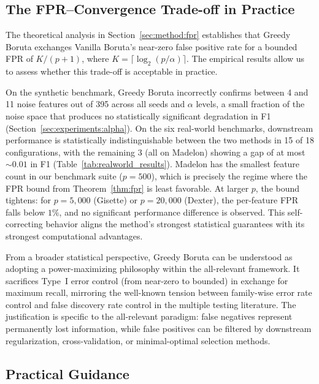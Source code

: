 \documentclass[runningheads]{llncs}
\begin{document}
\subsection{The FPR--Convergence Trade-off in Practice}
\label{sec:discussion:tradeoff}

The theoretical analysis in Section~\ref{sec:method:fpr} establishes that Greedy Boruta exchanges Vanilla Boruta's near-zero false positive rate for a bounded FPR of $K/(p+1)$, where $K = \lceil \log_2(p/\alpha) \rceil$. The empirical results allow us to assess whether this trade-off is acceptable in practice. 

On the synthetic benchmark, Greedy Boruta incorrectly confirms between 4 and 11 noise features out of 395 across all seeds and $\alpha$ levels, a small fraction of the noise space that produces no statistically significant degradation in F1 (Section~\ref{sec:experiments:alpha}). On the six real-world benchmarks, downstream performance is statistically indistinguishable between the two methods in 15 of 18 configurations, with the remaining 3 (all on Madelon) showing a gap of at most ${\sim}0.01$ in F1 (Table~\ref{tab:realworld_results}). Madelon has the smallest feature count in our benchmark suite ($p = 500$), which is precisely the regime where the FPR bound from Theorem~\ref{thm:fpr} is least favorable. At larger $p$, the bound tightens: for $p = 5{,}000$ (Gisette) or $p = 20{,}000$ (Dexter), the per-feature FPR falls below $1\%$, and no significant performance difference is observed. This self-correcting behavior aligns the method's strongest statistical guarantees with its strongest computational advantages.

From a broader statistical perspective, Greedy Boruta can be understood as adopting a power-maximizing philosophy within the all-relevant framework. It sacrifices Type~I error control (from near-zero to bounded) in exchange for maximum recall, mirroring the well-known tension between family-wise error rate control and false discovery rate control in the multiple testing literature. The justification is specific to the all-relevant paradigm: false negatives represent permanently lost information, while false positives can be filtered by downstream regularization, cross-validation, or minimal-optimal selection methods.

\subsection{Practical Guidance}
\label{sec:discussion:guidance}
\end{document}
